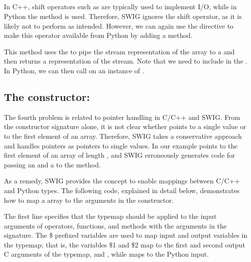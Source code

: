 \subsection{ }%
In C++, shift operators such as  are typically used to implement I/O, while in
Python the  method is used.    
Therefore, SWIG ignores the shift operator, as it is likely not to perform as intended. 
However, we can again use the  directive to make this
operator available from Python by adding a   method.
This method uses the  %
to pipe the stream representation of the array to a
 and then returns a 
representation of the stream.
Note that we need to include  in the .
In Python, we can then call  on an instance of .

\subsection{The constructor: }
The fourth problem is related to pointer handling in C/C++ and SWIG. From
the constructor signature alone, it is not clear whether  points to a single value or to the first element of an array.
Therefore, SWIG takes a conservative approach and handles pointers as
pointers to single values. In our example  points to the first element of an array of length , and SWIG erroneously generates code for passing an  and a  to the method. 

As a remedy, SWIG provides the  concept to enable mappings
between C/C++ and Python types. The following code, explained in detail
below, demonstrates how to map a \numpy array to the  
arguments in the constructor.
The first line specifies that the typemap should be applied to the input
 arguments of operators, functions, and methods with the 
 arguments in the signature. 
The \$ prefixed variables are used to map input and output variables in the typemap; 
that is, the variables \$1 and \$2 map to the first and second output C
arguments of the typemap,  and , while 
maps to the Python input. 

